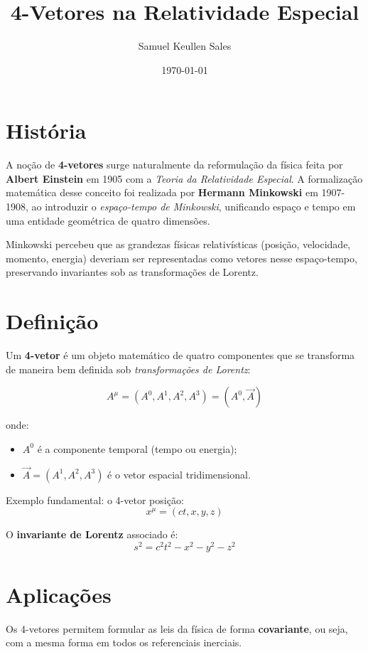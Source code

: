 \documentclass[12pt,a4paper]{article}
\title{4-Vetores na Relatividade Especial}
\author{Samuel Keullen Sales}
\date{\today}
\begin{document}
\maketitle

\section{História}
A noção de \textbf{4-vetores} surge naturalmente da reformulação da física feita por \textbf{Albert Einstein} em 1905 com a \textit{Teoria da Relatividade Especial}.  
A formalização matemática desse conceito foi realizada por \textbf{Hermann Minkowski} em 1907-1908, ao introduzir o \textit{espaço-tempo de Minkowski}, unificando espaço e tempo em uma entidade geométrica de quatro dimensões.  

Minkowski percebeu que as grandezas físicas relativísticas (posição, velocidade, momento, energia) deveriam ser representadas como vetores nesse espaço-tempo, preservando invariantes sob as transformações de Lorentz.

\section{Definição}
Um \textbf{4-vetor} é um objeto matemático de quatro componentes que se transforma de maneira bem definida sob \textit{transformações de Lorentz}:

\begin{equation}
A^{\mu} = (A^0, A^1, A^2, A^3) = (A^0, \vec{A})
\end{equation}

\noindent onde:
\begin{itemize}
    \item $A^0$ é a componente temporal (tempo ou energia);
    \item $\vec{A} = (A^1, A^2, A^3)$ é o vetor espacial tridimensional.
\end{itemize}

Exemplo fundamental: o 4-vetor posição:
\begin{equation}
x^\mu = (ct, x, y, z)
\end{equation}

O \textbf{invariante de Lorentz} associado é:
\begin{equation}
s^2 = c^2 t^2 - x^2 - y^2 - z^2
\end{equation}

\section{Aplicações}
Os 4-vetores permitem formular as leis da física de forma \textbf{covariante}, ou seja, com a mesma forma em todos os referenciais inerciais.  
\end{document}
